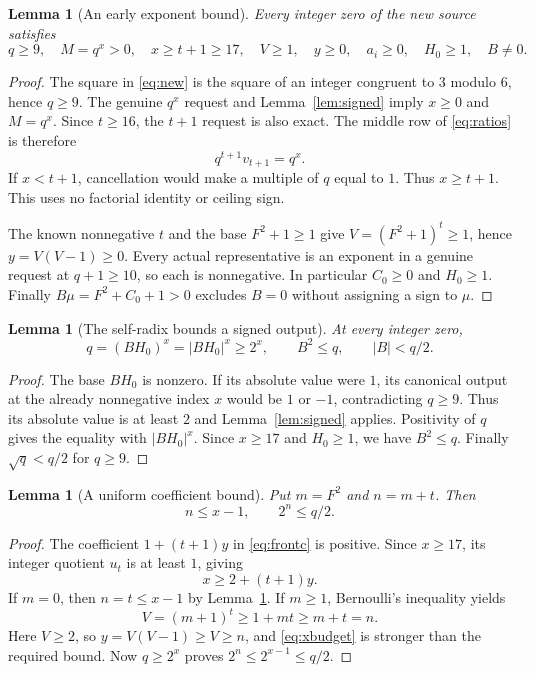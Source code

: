 \documentclass[11pt,letterpaper]{article}
\newtheorem{lemma}[theorem]{Lemma}
\begin{document}
\begin{lemma}[An early exponent bound]\label{lem:early}
Every integer zero of the new source satisfies
\[
 q\ge9,\quad M=q^x>0,\quad x\ge t+1\ge17,\quad
 V\ge1,\quad y\ge0,\quad a_i\ge0,\quad H_0\ge1,\quad B\ne0.
\]
\end{lemma}
\begin{proof}
The square in \eqref{eq:new} is the square of an integer congruent
to $3$ modulo $6$, hence $q\ge9$. The genuine $q^x$ request and
Lemma~\ref{lem:signed} imply $x\ge0$ and $M=q^x$.
Since $t\ge16$, the $t+1$ request is also exact. The middle row of
\eqref{eq:ratios} is therefore
\[
 q^{t+1}v_{t+1}=q^x.
\]
If $x<t+1$, cancellation would make a multiple of $q$ equal to $1$.
Thus $x\ge t+1$. This uses no factorial identity or ceiling sign.

The known nonnegative $t$ and the base $F^2+1\ge1$ give
$V=(F^2+1)^t\ge1$, hence $y=V(V-1)\ge0$.
Every actual representative is an exponent in a genuine request
at $q+1\ge10$, so each is nonnegative. In particular $C_0\ge0$
and $H_0\ge1$. Finally
$B\mu=F^2+C_0+1>0$ excludes $B=0$ without assigning a sign to $\mu$.
\end{proof}

\begin{lemma}[The self-radix bounds a signed output]\label{lem:radix}
At every integer zero,
\[
 q=(BH_0)^x=|BH_0|^x\ge2^x,\qquad
 B^2\le q,\qquad |B|<q/2.
\]
\end{lemma}
\begin{proof}
The base $BH_0$ is nonzero. If its absolute value were $1$, its
canonical output at the already nonnegative index $x$ would be
$1$ or $-1$, contradicting $q\ge9$. Thus its absolute value is at
least $2$ and Lemma~\ref{lem:signed} applies. Positivity of $q$
gives the equality with $|BH_0|^x$. Since $x\ge17$ and $H_0\ge1$,
we have $B^2\le q$. Finally $\sqrt q<q/2$ for $q\ge9$.
\end{proof}

\begin{lemma}[A uniform coefficient bound]\label{lem:coefficient}
Put $m=F^2$ and $n=m+t$. Then
\[
 n\le x-1,\qquad 2^n\le q/2.
\]
\end{lemma}
\begin{proof}
The coefficient $1+(t+1)y$ in \eqref{eq:frontc} is positive.
Since $x\ge17$, its integer quotient $u_t$ is at least $1$, giving
\begin{equation}\label{eq:xbudget}
 x\ge 2+(t+1)y.
\end{equation}
If $m=0$, then $n=t\le x-1$ by Lemma~\ref{lem:early}.
If $m\ge1$, Bernoulli's inequality yields
\[
 V=(m+1)^t\ge1+mt\ge m+t=n.
\]
Here $V\ge2$, so $y=V(V-1)\ge V\ge n$, and
\eqref{eq:xbudget} is stronger than the required bound.
Now $q\ge2^x$ proves $2^n\le2^{x-1}\le q/2$.
\end{proof}
\end{document}
